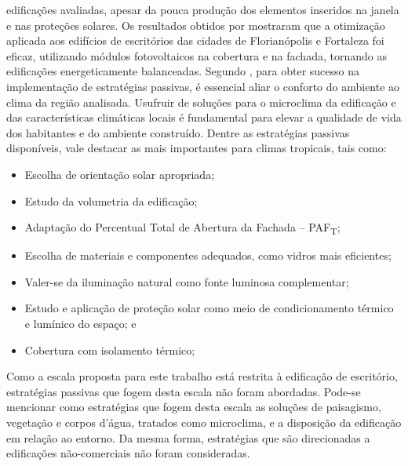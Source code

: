 edificações avaliadas, apesar da pouca produção dos elementos inseridos na janela e 
nas proteções solares. Os resultados obtidos por \textcite{Didone2014a} mostraram que 
a otimização aplicada aos edifícios de escritórios das cidades de Florianópolis e 
Fortaleza foi eficaz, utilizando módulos fotovoltaicos na cobertura e na fachada, 
tornando as edificações energeticamente balanceadas.\vspace*{0.3cm} \newline
Segundo \textcite{Noguchi2016}, para obter sucesso na implementação de estratégias passivas, 
é essencial aliar o conforto do ambiente ao clima da região analisada. Usufruir 
de soluções para o microclima da edificação e das características climáticas locais 
é fundamental para elevar a qualidade de vida dos habitantes e do ambiente construído. 
Dentre as estratégias passivas disponíveis, vale destacar as mais importantes para 
climas tropicais, tais como:
    \begin{itemize}
        \item Escolha de orientação solar apropriada;
        \item Estudo da volumetria da edificação;
        \item Adaptação do Percentual Total de Abertura da Fachada – PAF\textsubscript{T};
        \item Escolha de materiais e componentes adequados, como vidros mais eficientes;
        \item Valer-se da iluminação natural como fonte luminosa complementar;
        \item Estudo e aplicação de proteção solar como meio de condicionamento térmico e lumínico do espaço; e
        \item Cobertura com isolamento térmico;    
    \end{itemize}
Como a escala proposta para este trabalho está restrita à edificação de escritório, 
estratégias passivas que fogem desta escala não foram abordadas. Pode-se mencionar como 
estratégias que fogem desta escala as soluções de paisagismo, vegetação e corpos d’água, 
tratados como microclima, e a disposição da edificação em relação ao entorno. Da mesma 
forma, estratégias que são direcionadas a edificações não-comerciais não foram consideradas.